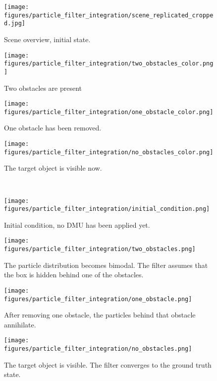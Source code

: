 \documentclass[letterpaper, 10 pt, journal, twoside]{ieeetran}  %
\begin{document}
\begin{figure*}[htp]
	\centering
	\begin{subfigure}[t]{0.24\textwidth}
		\texttt{[image: figures/particle\_filter\_integration/scene\_replicated\_cropped.jpg]}
		\caption{Scene overview, initial state.}
		\label{fig:pfscene}
	\end{subfigure}
	\hfill
	\begin{subfigure}[t]{0.24\textwidth}
		\texttt{[image: figures/particle\_filter\_integration/two\_obstacles\_color.png]}
		\caption{Two obstacles are present}
		\label{fig:pf2_color}
	\end{subfigure}
	\hfill
	\begin{subfigure}[t]{0.24\textwidth}
		\texttt{[image: figures/particle\_filter\_integration/one\_obstacle\_color.png]}
		\caption{One obstacle has been removed.}
		\label{fig:pf1_color}
	\end{subfigure}
	\hfill
	\begin{subfigure}[t]{0.24\textwidth}
		\texttt{[image: figures/particle\_filter\_integration/no\_obstacles\_color.png]}
		\caption{The target object is visible now.}
		\label{fig:pf0_color}
	\end{subfigure}\\
	\begin{subfigure}[t]{0.24\textwidth}
		\texttt{[image: figures/particle\_filter\_integration/initial\_condition.png]}
		\caption{Initial condition, no DMU has been applied yet.}
		\label{fig:pf_initial}
	\end{subfigure}
	\hfill
	\begin{subfigure}[t]{0.24\textwidth}
		\texttt{[image: figures/particle\_filter\_integration/two\_obstacles.png]}
		\caption{The particle distribution becomes bimodal. The filter assumes that the box is hidden behind one of the obstacles.}
		\label{fig:pf2}
	\end{subfigure}
	\hfill
	\begin{subfigure}[t]{0.24\textwidth}
		\texttt{[image: figures/particle\_filter\_integration/one\_obstacle.png]}
		\caption{After removing one obstacle, the particles behind that obstacle annihilate.}
		\label{fig:pf1}
	\end{subfigure}
	\hfill
	\begin{subfigure}[t]{0.24\textwidth}
		\texttt{[image: figures/particle\_filter\_integration/no\_obstacles.png]}
		\caption{The target object is visible. The filter converges to the ground truth state.}

\end{subfigure}
\end{figure*}
\end{document}
